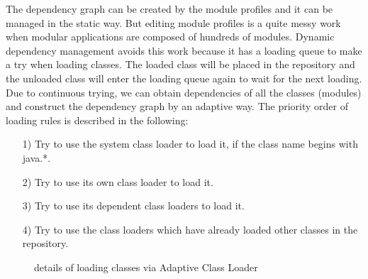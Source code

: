 \documentclass[conference]{IEEEtran}
\begin{document}
The dependency graph can be created by the module profiles and it can be managed in the static way.
But editing module profiles is a quite messy work when modular applications are composed of hundreds of modules.
Dynamic dependency management avoids this work because it has a loading queue to make a try when loading classes.
The loaded class will be placed in the repository and the unloaded class will enter the loading queue again to wait for the next loading.
Due to continuous trying, we can obtain dependencies of all the classes (modules) and construct the dependency graph by an adaptive way.
The priority order of loading rules is described in the following:
\begin{itemize}[]
\item[1)] Try to use the system class loader to load it, if the class name begins with java.*.
\item[2)] Try to use its own class loader to load it.
\item[3)] Try to use its dependent class loaders to load it.
\item[4)] Try to use the class loaders which have already loaded other classes in the repository. 
\end{itemize}

\begin{figure}[ht]
\centering
{}
\hfil
{}
\hfil
{}
\caption{details of loading classes via Adaptive Class Loader}
\label{fig:loading_queue}
\end{figure}
\end{document}
